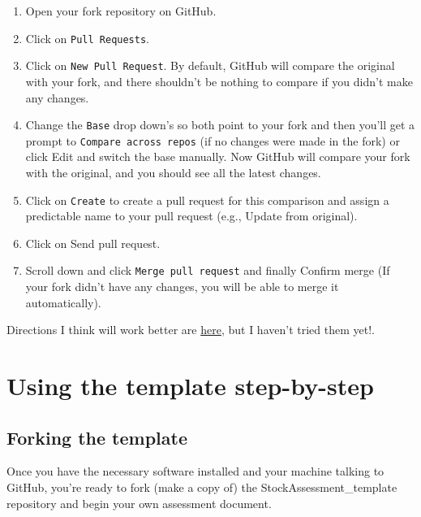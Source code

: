 \documentclass[12pt,]{article}
\providecommand{\tightlist}{%
  \setlength{\itemsep}{0pt}\setlength{\parskip}{0pt}}
\begin{document}
\begin{enumerate}
\def\labelenumi{\arabic{enumi}.}
\tightlist
\item
  Open your fork repository on GitHub.
\item
  Click on \texttt{Pull\ Requests}.
\item
  Click on \texttt{New\ Pull\ Request}. By default, GitHub will compare
  the original with your fork, and there shouldn't be nothing to compare
  if you didn't make any changes.
\item
  Change the \texttt{Base} drop down's so both point to your fork and
  then you'll get a prompt to \texttt{Compare\ across\ repos} (if no
  changes were made in the fork) or click Edit and switch the base
  manually. Now GitHub will compare your fork with the original, and you
  should see all the latest changes.
\item
  Click on \texttt{Create} to create a pull request for this comparison
  and assign a predictable name to your pull request (e.g., Update from
  original).
\item
  Click on Send pull request.
\item
  Scroll down and click \texttt{Merge\ pull\ request} and finally
  Confirm merge (If your fork didn't have any changes, you will be able
  to merge it automatically).
\end{enumerate}

Directions I think will work better are
\href{https://2buntu.com/articles/1459/keeping-your-forked-repo-synced-with-the-upstream-source/}{here},
but I haven't tried them yet!.

\section{Using the template
step-by-step}\label{using-the-template-step-by-step}

\subsection{Forking the template}\label{forking-the-template}

Once you have the necessary software installed and your machine talking
to GitHub, you're ready to fork (make a copy of) the
StockAssessment\_template repository and begin your own assessment
document.
\end{document}
